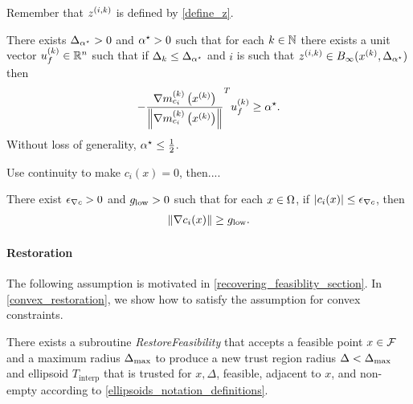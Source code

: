 Remember that ${z^{(i, k)}}$ is defined by \cref{define_z}.
\begin{assumption}
\label{minangleassumption_alt}
There exists ${\Delta_{\alpha^{\star}}} > 0$ and ${ \alpha^{\star} } > 0$ such that for each $k \in \mathbb N$ there exists
a unit vector ${u^{(k)}_f} \in \mathbb R^n$
such that if $\Delta_k \le {\Delta_{\alpha^{\star}}}$ and
$i$ is such that ${z^{(i, k)}} \in B_{\infty}(x^{(k)}, {\Delta_{\alpha^{\star}}})$
then
\begin{align*}
-\frac {{\nabla m_{c_i}^{(k)}\left(x^{(k)}\right)}}{\left\|{\nabla m_{c_i}^{(k)}\left(x^{(k)}\right)}\right\|} ^T{u^{(k)}_f} \ge { \alpha^{\star} }.
\end{align*}
Without loss of generality, ${ \alpha^{\star} } \le \frac 1 2$.
\end{assumption}



\begin{boxedcomment}
Use continuity to make $c_i(x) = 0$, then....
\end{boxedcomment}

\begin{assumption}
\label{mingradassumption}
There exist ${\epsilon_{\nabla c}} > 0$ and ${ g_{\textrm{low}} } > 0$ such that for each $x \in \Omega$, if $\left|c_i(x)\right| \le {\epsilon_{\nabla c}}$, then
\begin{align*}
\| \nabla c_i(x) \| \ge { g_{\textrm{low}} }.
\end{align*}
\end{assumption}


\paragraph*{Restoration}


The following assumption is motivated in \cref{recovering_feasiblity_section}.
In \cref{convex_restoration}, we show how to satisfy the assumption for convex constraints.

\begin{assumption}
\label{restorability_assumption}
There exists a subroutine \emph{RestoreFeasibility} that accepts a feasible point $x \in {\mathcal F}$ and a maximum radius ${\Delta_{\textrm{max}}}$ to produce
a new trust region radius $\Delta < {\Delta_{\textrm{max}}}$ and ellipsoid $T_{\textrm{interp}}$ that is trusted for 
$x, \Delta$, feasible, adjacent to $x$, and non-empty according to \cref{ellipsoids_notation_definitions}.
\end{assumption}




